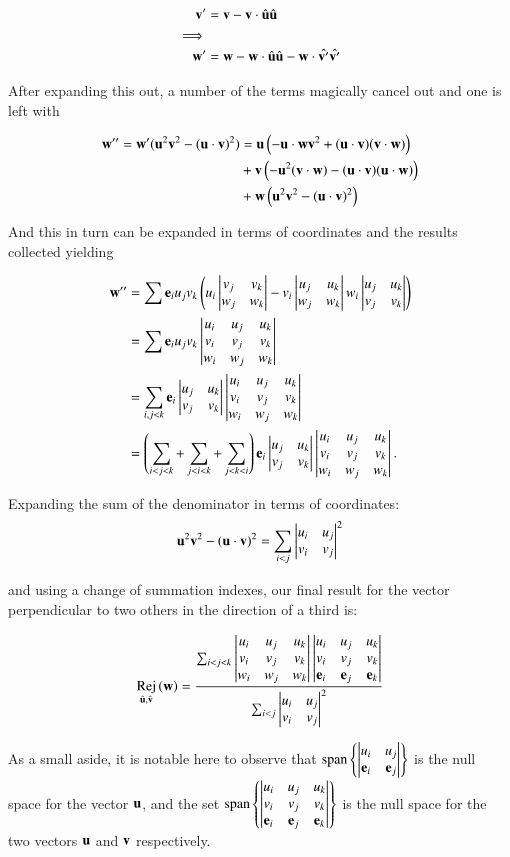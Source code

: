 \documentclass{article}      %
\DeclareMathOperator{\RejName}{Rej}
\newcommand{\Rej}[2]{\RejName_{#1}\left( {#2} \right)}
\begin{document}
\begin{align*}
\Bv' &= \Bv - \Bv \cdot \ucap \ucap \\
\implies & \\
\Bw' &= \Bw - \Bw \cdot \ucap \ucap - \Bw \cdot \hat{\Bv'} \hat{\Bv'}
\end{align*}

After expanding this out, a number of the terms magically cancel out and one is left with

\begin{align*}
\Bw'' = \Bw' (\Bu^2\Bv^2 - (\Bu \cdot \Bv)^2)
&= \Bu \left(-\Bu \cdot \Bw \Bv^2 + (\Bu \cdot \Bv)(\Bv \cdot \Bw)\right)  \\
&+ \Bv \left(-\Bu^2(\Bv \cdot \Bw) - (\Bu \cdot \Bv)(\Bu \cdot \Bw)\right)  \\
&+ \Bw \left(\Bu^2\Bv^2 - (\Bu \cdot \Bv)^2\right) \\
\end{align*}

And this in turn can be expanded in terms of coordinates and the results collected yielding

\begin{align*}
\Bw'' &= \sum \Be_i u_j v_k \left(
u_i \DETuvij{v}{w}{j}{k}
-v_i \DETuvij{u}{w}{j}{k}
w_i \DETuvij{u}{v}{j}{k}
\right) \\
&= \sum \Be_i u_j v_k \DETuvwijk{u}{v}{w}{i}{j}{k} \\
&= \sum_{i,j<k} \Be_i \DETuvij{u}{v}{j}{k} \DETuvwijk{u}{v}{w}{i}{j}{k} \\
&= 
\left(\sum_{i<j<k} + \sum_{j<i<k} + \sum_{j<k<i} \right) \Be_i \DETuvij{u}{v}{j}{k} \DETuvwijk{u}{v}{w}{i}{j}{k}.
\end{align*}

Expanding the sum of the denominator in terms of coordinates:
\[
\Bu^2\Bv^2 - (\Bu \cdot \Bv)^2 = \sum_{i<j} \DETuvij{u}{v}{i}{j}^2
\]

and using a change of summation indexes, our final result for the vector perpendicular to two others in the direction of a third is:

\begin{equation}\label{eqn:orthotwovectors}
\Rej{\ucap,\vcap}{\Bw} = 
\frac{\sum_{i<j<k} \DETuvwijk{u}{v}{w}{i}{j}{k} \DETuvwijk{u}{v}{\Be}{i}{j}{k}}
{\sum_{i<j} \DETuvij{u}{v}{i}{j}^2}
\end{equation}

As a small aside, it is notable here to observe that
$\Span\left\{\DETuvij{u}{\Be}{i}{j}\right\}$ is the null space for the vector $\Bu$, and
the set $\Span\left\{\DETuvwijk{u}{v}{\Be}{i}{j}{k}\right\}$ is the null space for the two vectors $\Bu$ and $\Bv$ respectively.
\end{document}

